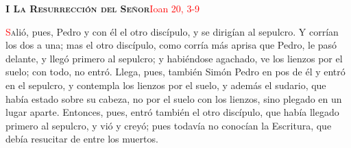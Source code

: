 \noindent\textbf{\textsc{I La Resurrección del Señor}}\hfill\textcolor{red}{Ioan 20, 3-9}

\vspace{0.25em}

\lettrine[lines=2]{\textcolor{red}{S}}alió, pues, Pedro y con él el otro discípulo, y se dirigían al sepulcro. Y corrían los dos a una; mas el otro
discípulo, como corría más aprisa que Pedro, le pasó delante, y llegó primero al sepulcro; y habiéndose agachado, ve los lienzos por el suelo; con
todo, no entró. Llega, pues, también Simón Pedro en pos de él y entró en el sepulcro, y contempla los lienzos por el suelo, y además el sudario, que 
había estado sobre su cabeza, no por el suelo con los lienzos, sino plegado en un lugar aparte. Entonces, pues, entró también el otro discípulo,
que había llegado primero al sepulcro, y vió y creyó; pues todavía no conocían la Escritura, que debía resucitar de entre los muertos.